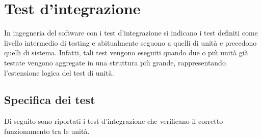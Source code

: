 \section{Test d'integrazione}\label{sec:test-d'integrazione}
In ingegneria del software con i test d'integrazione si indicano i test definiti come livello intermedio di testing e abitualmente seguono a quelli di unità e precedono quelli di sistema.
Infatti, tali test vengono eseguiti quando due o più unità già testate vengono aggregate in una struttura più grande, rappresentando l'estensione logica del test di unità.

\setcounter{rowcount}{0}
\subsection{Specifica dei test}\label{subsec:specifica-dei-test-integrazione}
Di seguito sono riportati i test d'integrazione che verificano il corretto funzionamento tra le unità.
